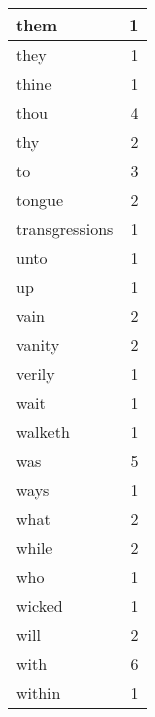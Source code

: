 \begin{center}
\begin{longtable}{l|r}
them & 1 \\ \hline
they & 1 \\ \hline
thine & 1 \\ \hline
thou & 4 \\ \hline
thy & 2 \\ \hline
to & 3 \\ \hline
tongue & 2 \\ \hline
transgressions & 1 \\ \hline
unto & 1 \\ \hline
up & 1 \\ \hline
vain & 2 \\ \hline
vanity & 2 \\ \hline
verily & 1 \\ \hline
wait & 1 \\ \hline
walketh & 1 \\ \hline
was & 5 \\ \hline
ways & 1 \\ \hline
what & 2 \\ \hline
while & 2 \\ \hline
who & 1 \\ \hline
wicked & 1 \\ \hline
will & 2 \\ \hline
with & 6 \\ \hline
within & 1 \\ \hline
\end{longtable}
\end{center}



\normalsize



